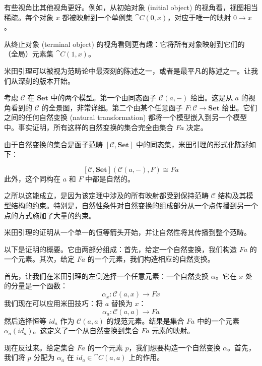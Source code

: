 \documentclass[DaoFP]{subfiles}
\begin{document}
有些视角比其他视角更好。例如，从初始对象 (initial object) 的视角看，视图相当稀疏。每个对象 $x$ 都被映射到一个单例集 $\cat C(0, x)$，对应于唯一的映射 $0 \to x$。

从终止对象 (terminal object) 的视角看则更有趣：它将所有对象映射到它们的（全局）元素集 $\cat C(1, x)$。

米田引理可以被视为范畴论中最深刻的陈述之一，或者是最平凡的陈述之一。让我们从深刻的版本开始。

考虑 $\mathcal{C}$ 在 $\mathbf{Set}$ 中的两个模型。第一个由同态函子 $\mathcal{C}(a, -)$ 给出。这是从 $a$ 的视角看到的 $\mathcal{C}$ 的全景图，非常详细。第二个由某个任意函子 $F \colon \mathcal{C} \to \mathbf{Set}$ 给出。它们之间的任何自然变换 (natural transformation) 都将一个模型嵌入到另一个模型中。事实证明，所有这样的自然变换的集合完全由集合 $F a$ 决定。

由于自然变换的集合是函子范畴 $[\mathcal{C}, \mathbf{Set}]$ 中的同态集，米田引理的形式化陈述如下：

\[ [\mathcal{C}, \mathbf{Set}]( \mathcal{C}(a, -), F) \cong F a \]
此外，这个同构在 $a$ 和 $F$ 中都是自然的。

之所以这能成立，是因为该定理中涉及的所有映射都受到保持范畴 $\mathcal{C}$ 结构及其模型结构的约束。特别是，自然性条件对自然变换的组成部分从一个点传播到另一个点的方式施加了大量的约束。

米田引理的证明从一个单一的恒等箭头开始，并让自然性将其传播到整个范畴。

以下是证明的概要。它由两部分组成：首先，给定一个自然变换，我们构造 $F a$ 的一个元素。其次，给定 $F a$ 的一个元素，我们构造相应的自然变换。

首先，让我们在米田引理的左侧选择一个任意元素：一个自然变换 $\alpha$。它在 $x$ 处的分量是一个函数：
\[ \alpha_x \colon \mathcal{C}(a, x) \to F x \]
我们现在可以应用米田技巧：将 $a$ 替换为 $x$：
\[ \alpha_a \colon \mathcal{C}(a, a) \to F a \]
然后选择恒等 $id_a$ 作为 $\mathcal{C}(a, a)$ 的规范元素。结果是集合 $F a$ 中的一个元素 $\alpha_a (id_a)$。这定义了一个从自然变换到集合 $F a$ 元素的映射。

现在反过来。给定集合 $F a$ 的一个元素 $p$，我们想要构造一个自然变换 $\alpha$。首先，我们将 $p$ 分配为 $\alpha_a$ 在 $id_a \in \cat C(a, a)$ 上的作用。
\end{document}
